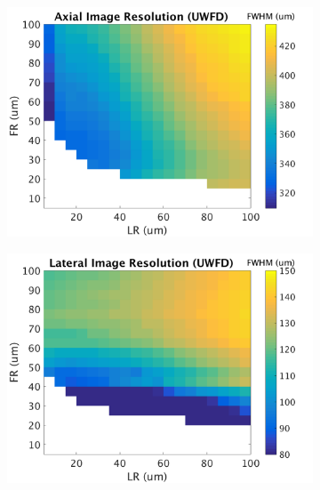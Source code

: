 \begin{figure}[hb!]
	\begin{centering}
	\begin{subfigure}{0.49\textwidth}
		\centering
		\includegraphics[width=\textwidth]{figures/uwfd_axial_imageres.png}
	\end{subfigure}
	\begin{subfigure}{0.49\textwidth}
		\centering
		\includegraphics[width=\textwidth]{figures/uwfd_lateral_imageres.png}
	\end{subfigure}
	\end{centering}
	\\
	\begin{subfigure}{0.49\textwidth}
		\centering

\end{subfigure}
\end{figure}
